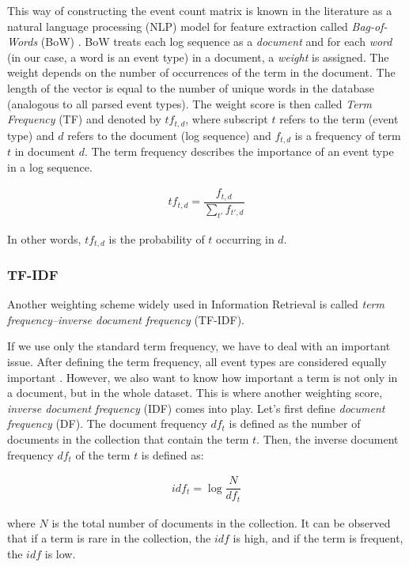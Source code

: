 This way of constructing the event count matrix is known in the literature as a natural language processing (NLP) model for feature extraction called \textit{Bag-of-Words} (BoW) \cite{informationRetrieval2008}. BoW treats each log sequence as a \textit{document} and for each \textit{word} (in our case, a word is an event type) in a document, a \textit{weight} is assigned. The weight depends on the number of occurrences of the term in the document. The length of the vector is equal to the number of unique words in the database (analogous to all parsed event types). The weight score is then called \textit{Term Frequency} (TF) and denoted by $tf_{t,d}$, where subscript $t$ refers to the term (event type) and $d$ refers to the document (log sequence) and $f_{t,d}$ is a frequency of term $t$ in document $d$. The term frequency describes the importance of an event type in a log sequence.

\begin{gather}
    tf_{t,d} = \dfrac{f_{t,d}}{\sum_{t'}f_{t', d}}
\end{gather}

In other words, $tf_{t, d}$ is the probability of $t$ occurring in $d$.

\subsubsection*{TF-IDF}
Another weighting scheme widely used in Information Retrieval is called \textit{term frequency–inverse document frequency} (TF-IDF). 

If we use only the standard term frequency, we have to deal with an important issue. After defining the term frequency, all event types are considered equally important \cite{informationRetrieval2008}. However, we also want to know how important a term is not only in a document, but in the whole dataset. This is where another weighting score, \textit{inverse document frequency} (IDF) comes into play. Let's first define \textit{ document frequency} (DF). The document frequency $df_t$ is defined as the number of documents in the collection that contain the term $t$. Then, the inverse document frequency $df_t$ of the term $t$ is defined as: 


\begin{gather}
    idf_t = \log{\dfrac{N}{df_t}}
    \label{formula:idf}
\end{gather}

where $N$ is the total number of documents in the collection. It can be observed that if a term is rare in the collection, the $idf$ is high, and if the term is frequent, the $idf$ is low.

